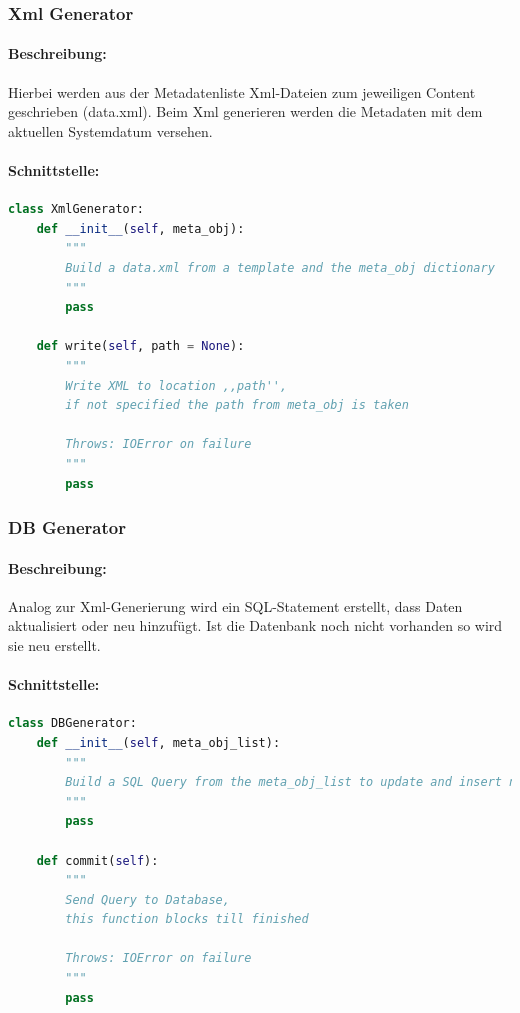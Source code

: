 \subsubsection{Xml Generator}
\label{ssub:xmlgen}
\paragraph{Beschreibung:}
\label{par:beschreibung_}
Hierbei werden aus der Metadatenliste Xml-Dateien zum jeweiligen Content geschrieben (data.xml). 
Beim Xml generieren werden die Metadaten mit dem aktuellen Systemdatum versehen.
\paragraph{Schnittstelle:}
\label{par:schnittstelle_}

\begin{lstlisting}[language=python]
class XmlGenerator:
    def __init__(self, meta_obj):
        """
        Build a data.xml from a template and the meta_obj dictionary
        """
        pass

    def write(self, path = None):
        """
        Write XML to location ,,path'', 
        if not specified the path from meta_obj is taken

        Throws: IOError on failure
        """
        pass
\end{lstlisting}

\subsubsection{DB Generator}
\label{ssub:dbgen}
\paragraph{Beschreibung:}
\label{par:beschreibung_}
Analog zur Xml-Generierung wird ein SQL-Statement erstellt, dass Daten aktualisiert oder neu hinzufügt.
Ist die Datenbank noch nicht vorhanden so wird sie neu erstellt.

\paragraph{Schnittstelle:}
\label{par:schnittstelle_}
\begin{lstlisting}[language=python]
class DBGenerator:
    def __init__(self, meta_obj_list):
        """
        Build a SQL Query from the meta_obj_list to update and insert new items the Database 
        """
        pass

    def commit(self):
        """
        Send Query to Database,
        this function blocks till finished

        Throws: IOError on failure
        """
        pass
\end{lstlisting}



